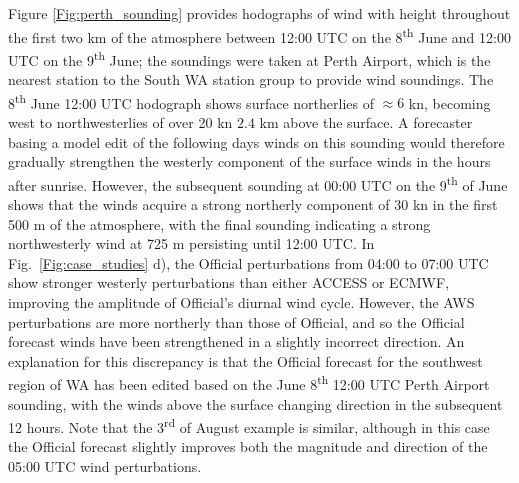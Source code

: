 \documentclass[alpha-refs]{wiley-article}
\begin{document}
Figure \ref{Fig:perth_sounding} provides hodographs of wind with height throughout the first two km of the atmosphere between 12:00 UTC on the 8\textsuperscript{th} June and 12:00 UTC on the 9\textsuperscript{th} June; the soundings were taken at Perth Airport, which is the nearest station to the South WA station group to provide wind soundings. The 8\textsuperscript{th} June 12:00 UTC hodograph shows surface northerlies of $\approx 6$ kn, becoming west to northwesterlies of over 20 kn $2.4$ km above the surface. A forecaster basing a model edit of the following days winds on this sounding would therefore gradually strengthen the westerly component of the surface winds in the hours after sunrise. However, the subsequent sounding at 00:00 UTC on the 9\textsuperscript{th} of June shows that the winds acquire a strong northerly component of 30 kn in the first 500 m of the atmosphere, with the final sounding indicating a strong northwesterly wind at 725 m persisting until 12:00 UTC. In Fig.~\ref{Fig:case_studies} d), the Official perturbations from 04:00 to 07:00 UTC show stronger westerly perturbations than either ACCESS or ECMWF, improving the amplitude of Official's diurnal wind cycle. However, the AWS perturbations are more northerly than those of Official, and so the Official forecast winds have been strengthened in a slightly incorrect direction. An explanation for this discrepancy is that the Official forecast for the southwest region of WA has been edited based on the June 8\textsuperscript{th} 12:00 UTC Perth Airport sounding, with the winds above the surface changing direction in the subsequent 12 hours. Note that the 3\textsuperscript{rd} of August example is similar, although in this case the Official forecast slightly improves both the magnitude and direction of the 05:00 UTC wind perturbations.
\end{document}
